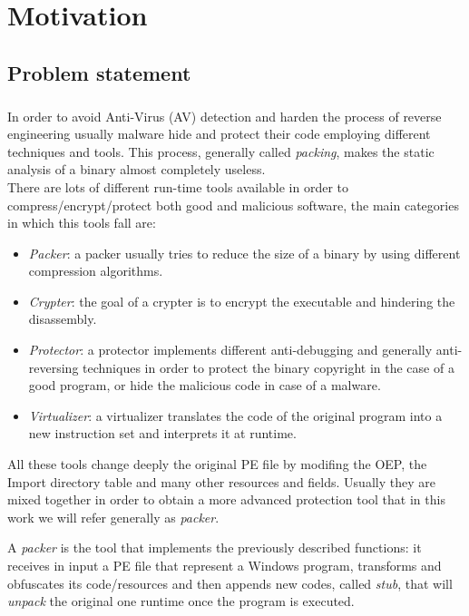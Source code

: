 \chapter{Motivation}
\label{chapter2}
\thispagestyle{empty}

\section{Problem statement}
\paragraph{}
In order to avoid Anti-Virus (AV) detection and harden the process of reverse engineering usually malware hide and protect their code employing different techniques and tools. This process, generally called \textit{packing}, makes the static analysis of a binary almost completely useless.\\There are lots of different run-time tools available in order to compress/encrypt/protect both good and malicious software, the main categories in which this tools fall are:
\begin{itemize}
\item \emph{Packer}: a packer usually tries to reduce the size of a binary by using different compression algorithms.
\item \emph{Crypter}: the goal of a crypter is to encrypt the executable and hindering the disassembly.
\item \emph{Protector}: a protector implements different anti-debugging and generally anti-reversing techniques in order to protect the binary copyright in the case of a good program, or hide the malicious code in case of a malware.
\item \emph{Virtualizer}: a virtualizer translates the code of the original program into a new  instruction set and  interprets it at runtime.
\end{itemize}

All these tools change deeply the original PE file by modifing the OEP, the Import directory table and many other resources and fields. Usually they are mixed together in order to obtain a more advanced protection tool that in this work we will refer generally as \textit{packer}.

A \textit{packer} is the tool that implements the previously described functions: it receives in input a PE file that represent a Windows program, transforms and obfuscates its code/resources and then appends new codes, called \textit{stub}, that will \textit{unpack} the original one runtime once the program is executed.\\\\

